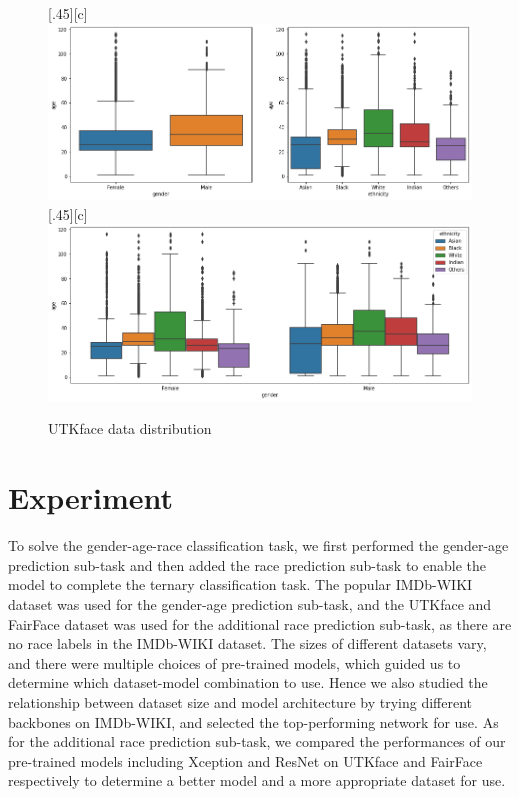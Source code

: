 \documentclass[DIV=calc, paper=a4, fontsize=10pt, twocolumn]{article}
\begin{document}
	

	
	\begin{figure}[h]
		\centering
		\subcaptionbox{}[.45\linewidth][c]{%
			\includegraphics[width=\linewidth]{imgs/UTKface-data-ana1.png}}\quad
		\subcaptionbox{}[.45\linewidth][c]{%
			\includegraphics[width=\linewidth]{imgs/UTKface-data-ana2.png}}\quad
		\caption{UTKface data distribution}
		\label{fig:utkfacedist}
	\end{figure}
	\section{Experiment}
	
	To solve the gender-age-race classification task, we first performed the gender-age prediction sub-task and then added the race prediction sub-task to enable the model to complete the ternary classification task. The popular IMDb-WIKI dataset was used for the gender-age prediction sub-task, and the UTKface and FairFace dataset was used for the additional race prediction sub-task, as there are no race labels in the IMDb-WIKI dataset. The sizes of different datasets vary, and there were multiple choices of pre-trained models, which guided us to determine which dataset-model combination to use. Hence we also studied the relationship between dataset size and model architecture by trying different backbones on IMDb-WIKI, and selected the top-performing network for use. As for the additional race prediction sub-task, we compared the performances of our pre-trained models including Xception and ResNet on UTKface and FairFace respectively to determine a better model and a more appropriate dataset for use. 
	
\end{document}
